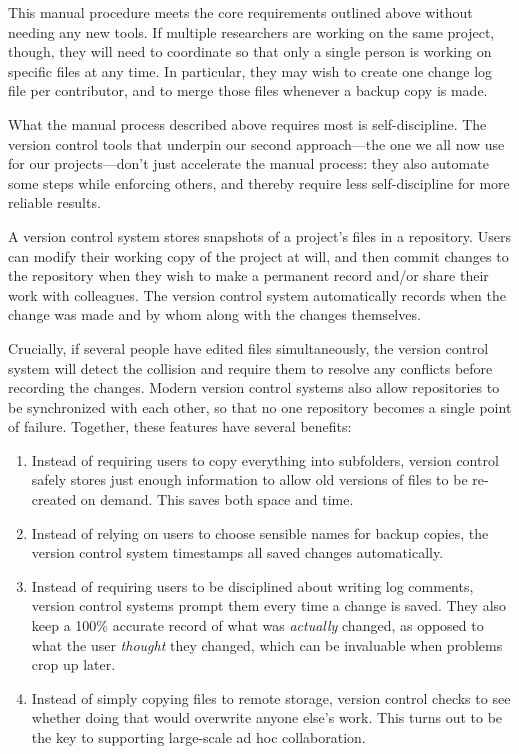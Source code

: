 \documentclass[10pt]{article}
\begin{document}
This manual procedure meets the core requirements outlined above without
needing any new tools. If multiple researchers are working on the same
project, though, they will need to coordinate so that only a single
person is working on specific files at any time. In particular, they may
wish to create one change log file per contributor, and to merge those
files whenever a backup copy is made.

What the manual process described above requires most is
self-discipline. The version control tools that underpin our second
approach---the one we all now use for our projects---don't just
accelerate the manual process: they also automate some steps while
enforcing others, and thereby require less self-discipline for more
reliable results.

A version control system stores snapshots of a project's files in a
repository. Users can modify their working copy of the project at will,
and then commit changes to the repository when they wish to make a
permanent record and/or share their work with colleagues. The version
control system automatically records when the change was made and by
whom along with the changes themselves.

Crucially, if several people have edited files simultaneously, the
version control system will detect the collision and require them to
resolve any conflicts before recording the changes. Modern version
control systems also allow repositories to be synchronized with each
other, so that no one repository becomes a single point of failure.
Together, these features have several benefits:

\begin{enumerate}
\item
  Instead of requiring users to copy everything into subfolders, version
  control safely stores just enough information to allow old versions of
  files to be re-created on demand. This saves both space and time.
\item
  Instead of relying on users to choose sensible names for backup
  copies, the version control system timestamps all saved changes
  automatically.
\item
  Instead of requiring users to be disciplined about writing log
  comments, version control systems prompt them every time a change is
  saved. They also keep a 100\% accurate record of what was
  \emph{actually} changed, as opposed to what the user \emph{thought}
  they changed, which can be invaluable when problems crop up later.
\item
  Instead of simply copying files to remote storage, version control
  checks to see whether doing that would overwrite anyone else's work.
  This turns out to be the key to supporting large-scale ad hoc
  collaboration.
\end{enumerate}
\end{document}
